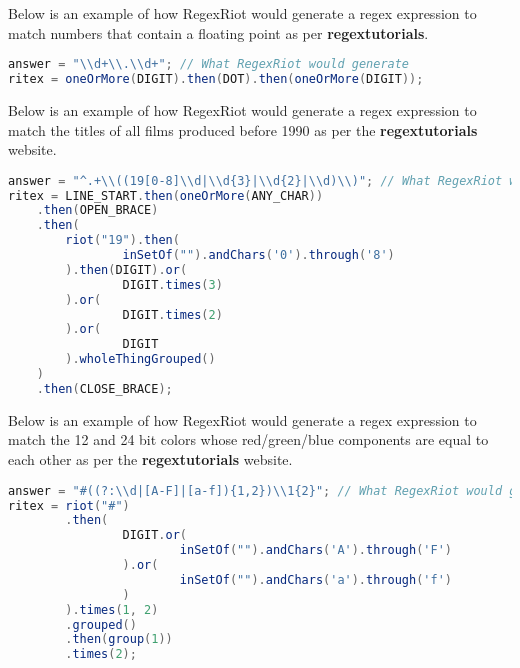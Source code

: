 \documentclass[conference]{IEEEtran}
\begin{document}
Below is an example of how RegexRiot would generate a regex expression
to match numbers that contain a floating point as per
\textbf{regextutorials}. \cite{regextutorials}

\begin{lstlisting}[language=Java]
answer = "\\d+\\.\\d+"; // What RegexRiot would generate
ritex = oneOrMore(DIGIT).then(DOT).then(oneOrMore(DIGIT));
\end{lstlisting}

Below is an example of how RegexRiot would generate a regex expression
to match the titles of all films produced before 1990 as per the
\textbf{regextutorials} website.\cite{regextutorials}

\begin{lstlisting}[language=Java]
answer = "^.+\\((19[0-8]\\d|\\d{3}|\\d{2}|\\d)\\)"; // What RegexRiot would generate
ritex = LINE_START.then(oneOrMore(ANY_CHAR))
    .then(OPEN_BRACE)
    .then(
        riot("19").then(
                inSetOf("").andChars('0').through('8')
        ).then(DIGIT).or(
                DIGIT.times(3)
        ).or(
                DIGIT.times(2)
        ).or(
                DIGIT
        ).wholeThingGrouped()
    )
    .then(CLOSE_BRACE);
    \end{lstlisting}

Below is an example of how RegexRiot would generate a regex expression to
match the 12 and 24 bit colors whose red/green/blue components are equal to
each other as per the \textbf{regextutorials} website.\cite{regextutorials}

\begin{lstlisting}[language=Java]
answer = "#((?:\\d|[A-F]|[a-f]){1,2})\\1{2}"; // What RegexRiot would generate
ritex = riot("#")
        .then(
                DIGIT.or(
                        inSetOf("").andChars('A').through('F')
                ).or(
                        inSetOf("").andChars('a').through('f')
                )
        ).times(1, 2)
        .grouped()
        .then(group(1))
        .times(2);
\end{lstlisting}
\end{document}
